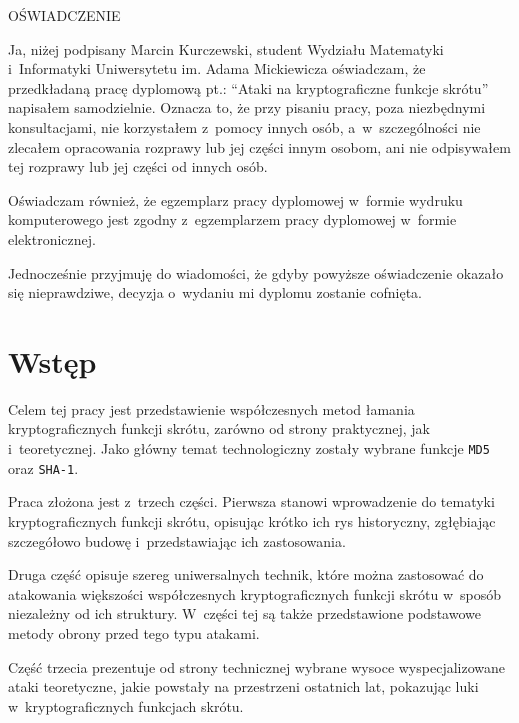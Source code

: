 \documentclass[12pt,a4paper,twoside]{article}
\begin{document}
\newpage
\thispagestyle{empty}
\begin{center}
    OŚWIADCZENIE
\end{center}

Ja, niżej podpisany Marcin Kurczewski, student Wydziału Matematyki
i~Informatyki Uniwersytetu im. Adama Mickiewicza oświadczam, że przedkładaną
pracę dyplomową pt.: ``Ataki na kryptograficzne funkcje skrótu'' napisałem
samodzielnie. Oznacza to, że przy pisaniu pracy, poza niezbędnymi
konsultacjami, nie korzystałem z~pomocy innych osób, a~w~szczególności nie
zlecałem opracowania rozprawy lub jej części innym osobom, ani nie odpisywałem
tej rozprawy lub jej części od innych osób.

Oświadczam również, że egzemplarz pracy dyplomowej w~formie wydruku
komputerowego jest zgodny z~egzemplarzem pracy dyplomowej w~formie
elektronicznej.

Jednocześnie przyjmuję do wiadomości, że gdyby powyższe oświadczenie okazało
się nieprawdziwe, decyzja o~wydaniu mi dyplomu zostanie cofnięta.


\newpage
\setcounter{tocdepth}{3}
\tableofcontents

\newpage
\pagestyle{fancy}


\section{Wstęp}
Celem tej pracy jest przedstawienie współczesnych metod łamania
kryptograficznych funkcji skrótu, zarówno od strony praktycznej, jak
i~teoretycznej. Jako główny temat technologiczny zostały wybrane funkcje
\texttt{MD5} oraz \texttt{SHA-1}.

Praca złożona jest z~trzech części. Pierwsza stanowi wprowadzenie do tematyki
kryptograficznych funkcji skrótu, opisując krótko ich rys historyczny,
zgłębiając szczegółowo budowę i~przedstawiając ich zastosowania.

Druga część opisuje szereg uniwersalnych technik, które można zastosować do
atakowania większości współczesnych kryptograficznych funkcji skrótu w~sposób
niezależny od ich struktury. W~części tej są także przedstawione podstawowe
metody obrony przed tego typu atakami.

Część trzecia prezentuje od strony technicznej wybrane wysoce wyspecjalizowane
ataki teoretyczne, jakie powstały na przestrzeni ostatnich lat, pokazując luki
w~kryptograficznych funkcjach skrótu.
\end{document}
